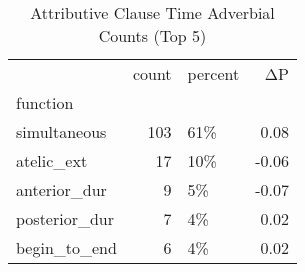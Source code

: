 \begin{table}[htbp!]
\centering
\caption{Attributive Clause Time Adverbial Counts (Top 5)}
\label{table:submod_func_cp}
\begin{tabular}{lrlr}
\toprule
{} &  count & percent &    ΔP \\
function      &        &         &       \\
\midrule
simultaneous  &    103 &     61\% &  0.08 \\
atelic\_ext    &     17 &     10\% & -0.06 \\
anterior\_dur  &      9 &      5\% & -0.07 \\
posterior\_dur &      7 &      4\% &  0.02 \\
begin\_to\_end  &      6 &      4\% &  0.02 \\
\bottomrule
\end{tabular}
\end{table}
